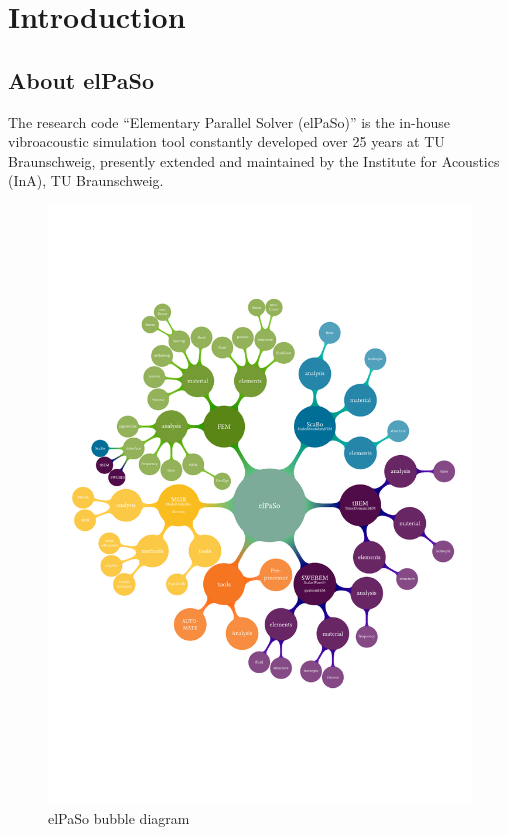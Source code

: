 \chapter{Introduction}

\section{About elPaSo}

The research code “Elementary Parallel Solver (elPaSo)” is the in-house vibroacoustic simulation tool constantly developed over 25 years at TU Braunschweig, presently extended and maintained by the Institute for Acoustics (InA), TU Braunschweig.

\begin{figure}[h!]
    \centering
    \includegraphics[trim={0 6cm 0 4cm},scale=0.7]{images/elPaSo_bubble.pdf}
    \caption{elPaSo bubble diagram}
\end{figure}

